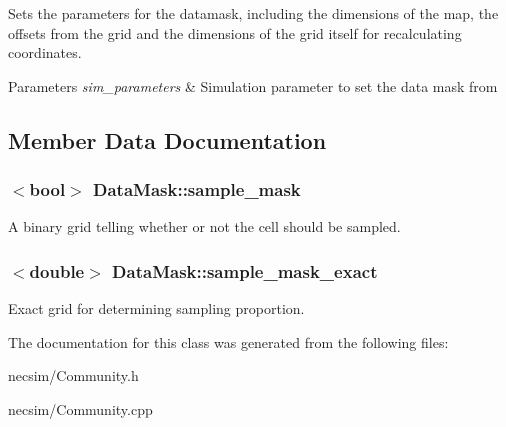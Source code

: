 Sets the parameters for the datamask, including the dimensions of the map, the offsets from the grid and the dimensions of the grid itself for recalculating coordinates. 


\begin{DoxyParams}{Parameters}
{\em sim\+\_\+parameters} & Simulation parameter to set the data mask from \\
\hline
\end{DoxyParams}


\subsection{Member Data Documentation}
\subsubsection[{\texorpdfstring{sample\+\_\+mask}{sample_mask}}]{$<$bool$>$ Data\+Mask\+::sample\+\_\+mask\hspace{0.3cm}{\ttfamily [inherited]}}\hypertarget{class_data_mask_a0ebe741d4b22824f93dacddd175d2c96}{}\label{class_data_mask_a0ebe741d4b22824f93dacddd175d2c96}
A binary grid telling whether or not the cell should be sampled. 
\subsubsection[{\texorpdfstring{sample\+\_\+mask\+\_\+exact}{sample_mask_exact}}]{$<$double$>$ Data\+Mask\+::sample\+\_\+mask\+\_\+exact\hspace{0.3cm}{\ttfamily [inherited]}}\hypertarget{class_data_mask_acc231ebddc3e5db0103220b20d968a4f}{}\label{class_data_mask_acc231ebddc3e5db0103220b20d968a4f}
Exact grid for determining sampling proportion. 

The documentation for this class was generated from the following files\+:\begin{DoxyCompactItemize}
\item 
necsim/Community.\+h\item 
necsim/Community.\+cpp\end{DoxyCompactItemize}
